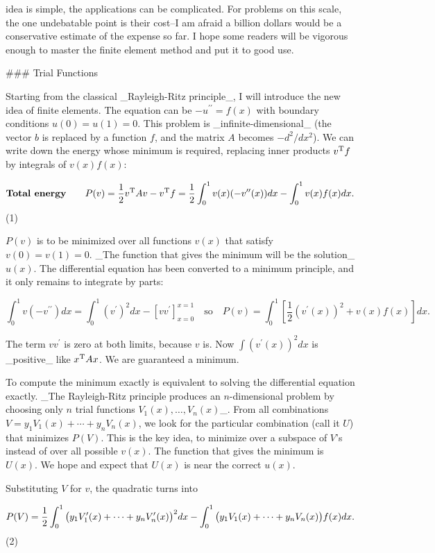 idea is simple, the applications can be complicated. For problems on this scale, the one undebatable point is their cost--I am afraid a billion dollars would be a conservative estimate of the expense so far. I hope some readers will be vigorous enough to master the finite element method and put it to good use.

### Trial Functions

Starting from the classical _Rayleigh-Ritz principle_, I will introduce the new idea of finite elements. The equation can be \(-u^{\prime\prime}=f(x)\) with boundary conditions \(u(0)=u(1)=0\). This problem is _infinite-dimensional_ (the vector \(b\) is replaced by a function \(f\), and the matrix \(A\) becomes \(-d^{2}/dx^{2}\)). We can write down the energy whose minimum is required, replacing inner products \(v^{\rm T}f\) by integrals of \(v(x)f(x)\):

\[\mbox{\bf Total energy}\qquad P(v)=\frac{1}{2}v^{\rm T}Av-v^{\rm T}f=\frac{1}{2} \int_{0}^{1}v(x)(-v^{\prime\prime}(x))dx-\int_{0}^{1}v(x)f(x)dx.\] (1)

\(P(v)\) is to be minimized over all functions \(v(x)\) that satisfy \(v(0)=v(1)=0\). _The function that gives the minimum will be the solution_\(u(x)\). The differential equation has been converted to a minimum principle, and it only remains to integrate by parts:

\[\int_{0}^{1}v(-v^{\prime\prime})dx=\int_{0}^{1}(v^{\prime})^{2}dx-[vv^{\prime }]_{x=0}^{x=1}\quad\mbox{so}\quad P(v)=\int_{0}^{1}\left[\frac{1}{2}(v^{ \prime}(x))^{2}+v(x)f(x)\right]dx.\]

The term \(vv^{\prime}\) is zero at both limits, because \(v\) is. Now \(\int(v^{\prime}(x))^{2}dx\) is _positive_ like \(x^{\rm T}Ax\). We are guaranteed a minimum.

To compute the minimum exactly is equivalent to solving the differential equation exactly. _The Rayleigh-Ritz principle produces an \(n\)-dimensional problem by choosing only \(n\) trial functions \(V_{1}(x),\ldots,V_{n}(x)\)_. From all combinations \(V=y_{1}V_{1}(x)+\cdots+y_{n}V_{n}(x)\), we look for the particular combination (call it \(U\)) that minimizes \(P(V)\). This is the key idea, to minimize over a subspace of \(V\)'s instead of over all possible \(v(x)\). The function that gives the minimum is \(U(x)\). We hope and expect that \(U(x)\) is near the correct \(u(x)\).

Substituting \(V\) for \(v\), the quadratic turns into

\[P(V)=\frac{1}{2}\int_{0}^{1}\big{(}y_{1}V_{1}^{\prime}(x)+\cdots+y_{n}V_{n}^{ \prime}(x)\big{)}^{2}dx-\int_{0}^{1}\big{(}y_{1}V_{1}(x)+\cdots+y_{n}V_{n}(x) \big{)}f(x)dx.\] (2)


